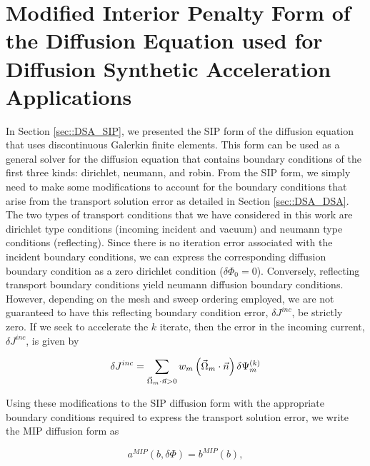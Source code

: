 \section{Modified Interior Penalty Form of the Diffusion Equation used for Diffusion Synthetic Acceleration Applications}
\label{sec::DSA_MIP}

In Section \ref{sec::DSA_SIP}, we presented the SIP form of the diffusion equation that uses discontinuous Galerkin finite elements. This form can be used as a general solver for the diffusion equation that contains boundary conditions of the first three kinds: dirichlet, neumann, and robin. From the SIP form, we simply need to make some modifications to account for the boundary conditions that arise from the transport solution error as detailed in Section \ref{sec::DSA_DSA}. The two types of transport conditions that we have considered in this work are dirichlet type conditions (incoming incident and vacuum) and neumann type conditions (reflecting). Since there is no iteration error associated with the incident boundary conditions, we can express the corresponding diffusion boundary condition as a zero dirichlet condition ($\delta \Phi_0 = 0$). Conversely, reflecting transport boundary conditions yield neumann diffusion boundary conditions. However, depending on the mesh and sweep ordering employed, we are not guaranteed to have this reflecting boundary condition error, $\delta J^{inc}$, be strictly zero. If we seek to accelerate the $k$ iterate, then the error in the incoming current, $\delta J^{inc}$, is given by

\begin{equation}
\label{eq::MIP_inc_curr_error}
\delta J^{inc} = \sum\displaylimits_{\vec{\Omega}_m \cdot \vec{n} > 0} w_m \left(\vec{\Omega}_m \cdot \vec{n} \right) \delta \Psi_m^{(k)}
\end{equation}

 \noindent Using these modifications to the SIP diffusion form with the appropriate boundary conditions required to express the transport solution error, we write the MIP diffusion form as

\begin{equation}
a^{MIP}( b, \delta \Phi) = b^{MIP}(b),
\label{eq::MIP_weak_form}
\end{equation}

